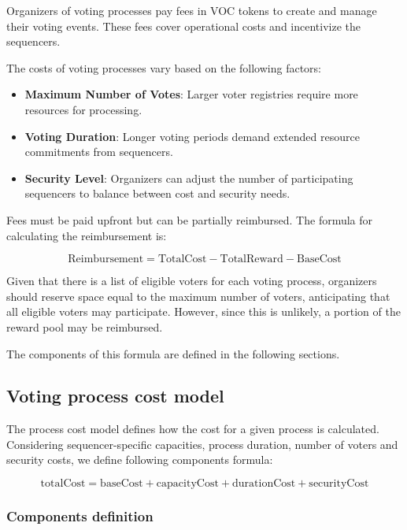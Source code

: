 Organizers of voting processes pay fees in VOC tokens to create and manage their voting events. These fees cover operational costs and incentivize the sequencers.

The costs of voting processes vary based on the following factors:

\begin{itemize}
	\item \textbf{Maximum Number of Votes}: Larger voter registries require more resources for processing.
	\item \textbf{Voting Duration}: Longer voting periods demand extended resource commitments from sequencers.
	\item \textbf{Security Level}: Organizers can adjust the number of participating sequencers to balance between cost and security needs.
\end{itemize}

Fees must be paid upfront but can be partially reimbursed. The formula for calculating the reimbursement is:

$$ \text{Reimbursement} = \text{TotalCost} - \text{TotalReward} - \text{BaseCost} $$

Given that there is a list of eligible voters for each voting process, organizers should reserve space equal to the maximum number of voters, anticipating that all eligible voters may participate. However, since this is unlikely, a portion of the reward pool may be reimbursed.

The components of this formula are defined in the following sections.

\subsection{Voting process cost model}

The process cost model defines how the cost for a given process is calculated.
Considering sequencer-specific capacities, process duration, number of voters and security costs, we define following components formula:

$$ \text{totalCost} = \text{baseCost} + \text{capacityCost} + \text{durationCost} + \text{securityCost} $$

\subsubsection{Components definition}

